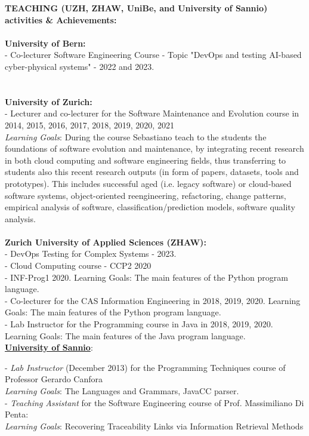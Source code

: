 \documentclass[10pt]{article}
\begin{document}
\vspace{2mm}


\textbf{TEACHING (UZH, ZHAW, UniBe, and University of Sannio) activities \& Achievements:}
\\\\
\textbf{University of Bern:} \\
-   Co-lecturer Software Engineering Course - Topic "DevOps and testing AI-based cyber-physical systems" - 2022 and 2023.\\  
\\\\
\textbf{University of Zurich:} \\
-   Lecturer and co-lecturer for the Software Maintenance and Evolution course in 2014, 2015, 2016, 2017, 2018, 2019, 2020, 2021\\   \textit{Learning Goals}: During the course Sebastiano teach to
the students the foundations of software evolution and maintenance, by integrating recent research in both cloud computing and
software engineering fields, thus transferring to students also this recent research outputs (in form of papers, datasets, tools and
prototypes). This includes successful aged (i.e. legacy software) or cloud-based software systems, object-oriented reengineering,
refactoring, change patterns, empirical analysis of software, classification/prediction models, software quality analysis.\\\\
\textbf{Zurich University of Applied Sciences (ZHAW):}\\
- DevOps Testing for Complex Systems - 2023.\\
- Cloud Computing course - CCP2 2020\\
- INF-Prog1 2020. Learning Goals: The main features of the Python program language.\\
- Co-lecturer for the CAS Information Engineering in 2018, 2019, 2020.
Learning Goals: The main features of the Python program language.\\
- Lab Instructor for the Programming course in Java in 2018, 2019, 2020.
Learning Goals: The main features of the Java program language.\\


\href{http://www.unisa.it}{\textbf{University of Sannio}}:

- \textit{Lab Instructor} (December 2013) for the Programming Techniques course of Professor Gerardo Canfora\\   \textit{Learning Goals}:   The Languages ​​and Grammars, JavaCC parser.\\
- \textit{Teaching Assistant } for the Software Engineering course of Prof. Massimiliano Di Penta:\\   \textit{Learning Goals}:   
Recovering Traceability Links via Information Retrieval Methods\\
\end{document}
